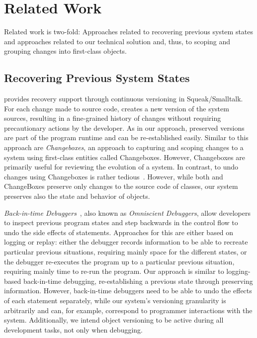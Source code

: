 \section{Related Work} \label{chapter:RELATED_WORK}

Related work is two-fold: Approaches related to recovering previous system states and approaches related to our technical solution and, thus, to scoping and grouping changes into first-class objects.

\subsection{Recovering Previous System States}

\emph{\coexist}\cite{Steinert2012COE} provides recovery support through continuous versioning in Squeak/Smalltalk.
For each change made to source code, \coexist creates a new version of the system sources, resulting in a fine-grained history of changes without requiring precautionary actions by the developer.
As in our approach, preserved versions are part of the program runtime and can be re-established easily.
Similar to this approach are \emph{Changeboxes}\cite{Denker2007EEC}, an approach to capturing and scoping changes to a system using first-class entities called Changeboxes.
However, Changeboxes are primarily useful for reviewing the evolution of a system. 
In contrast, to undo changes using Changeboxes is rather tedious~\cite{Steinert2012COE}.
However, while both \coexist and ChangeBoxes preserve only changes to
the source code of classes, our system preserves also the state and
behavior of objects.

\emph{Back-in-time Debuggers}~\cite{Lewis2003BIT}, also known as \emph{Omniscient Debuggers}, allow developers to inspect previous program states and step backwards in the control flow to undo the side effects of statements.
Approaches for this are either based on logging or replay: either the debugger records information to be able to recreate particular previous situations, requiring mainly space for the different states, or the debugger re-executes the program up to a particular previous situation, requiring mainly time to re-run the program.
Our approach is similar to logging-based back-in-time debugging, re-establishing a previous state through preserving information.
However, back-in-time debuggers need to be able to undo the effects of each statement separately, while our system's versioning granularity is arbitrarily and can, for example, correspond to programmer interactions with the system.
Additionally, we intend object versioning to be active during all development tasks, not only when debugging.


